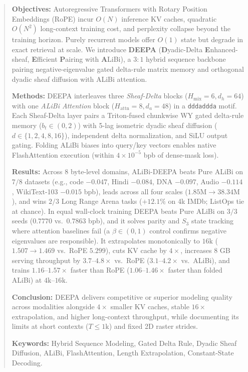 \documentclass[10pt,a4paper]{article}
\begin{document}
\begin{quote}
\small
\noindent\textbf{Objectives:} Autoregressive Transformers with Rotary Position Embeddings (RoPE) incur $O(N)$ inference KV caches, quadratic $O(N^2)$ long-context training cost, and perplexity collapse beyond the training horizon. Purely recurrent models offer $O(1)$ state but degrade in exact retrieval at scale. We introduce \textbf{DEEPA} (\textbf{D}yadic-Delta \textbf{E}nhanced-sheaf, \textbf{E}fficient \textbf{P}airing with \textbf{A}LiBi), a $3:1$ hybrid sequence backbone pairing negative-eigenvalue gated delta-rule matrix memory and orthogonal dyadic sheaf diffusion with ALiBi attention.

\vspace{3pt}
\noindent\textbf{Methods:} DEEPA interleaves three \emph{Sheaf-Delta} blocks ($H_{\text{mix}}=6, d_h=64$) with one \emph{ALiBi Attention} block ($H_{\text{attn}}=8, d_a=48$) in a \texttt{dddaddda} motif. Each Sheaf-Delta layer pairs a Triton-fused chunkwise WY gated delta-rule memory ($b_t \in (0,2)$) with 5-lag isometric dyadic sheaf diffusion ($d \in \{1,2,4,8,16\}$), independent delta normalization, and SiLU output gating. Folding ALiBi biases into query/key vectors enables native FlashAttention execution (within $4\times 10^{-5}$ bpb of dense-mask loss).

\vspace{3pt}
\noindent\textbf{Results:} Across 8 byte-level domains, ALiBi-DEEPA beats Pure ALiBi on $7/8$ datasets (e.g., code $-0.047$, Hindi $-0.084$, DNA $-0.097$, Audio $-0.114$, WikiText-103 $-0.015$ bpb), leads across all four scales ($1.85\text{M}\to 38.34\text{M}$), and wins $2/3$ Long Range Arena tasks ($+12.1\%$ on 4k IMDb; ListOps tie at chance). In equal wall-clock training DEEPA beats Pure ALiBi on $3/3$ seeds ($0.7770$ vs.\ $0.7863$ bpb), and it solves parity and $S_3$ state tracking where attention baselines fail (a $\beta\in(0,1)$ control confirms negative eigenvalues are responsible). It extrapolates monotonically to $16\text{k}$ ($1.507\to 1.469$ vs.\ RoPE $5.299$), cuts KV cache by $4\times$, increases 8 GB serving throughput by $3.7\text{--}4.8\times$ vs.\ RoPE ($3.1\text{--}4.2\times$ vs.\ ALiBi), and trains $1.16\text{--}1.57\times$ faster than RoPE ($1.06\text{--}1.46\times$ faster than folded ALiBi) at $4\text{k}\text{--}16\text{k}$.

\vspace{3pt}
\noindent\textbf{Conclusion:} DEEPA delivers competitive or superior modeling quality across modalities alongside $4\times$ smaller KV caches, stable $16\times$ extrapolation, and higher long-context throughput, while documenting its limits at short contexts ($T\le 1\text{k}$) and fixed 2D raster strides.

\vspace{4pt}
\noindent\textbf{Keywords:} Hybrid Sequence Modeling, Gated Delta Rule, Dyadic Sheaf Diffusion, ALiBi, FlashAttention, Length Extrapolation, Constant-State Decoding.
\end{quote}
\end{document}
